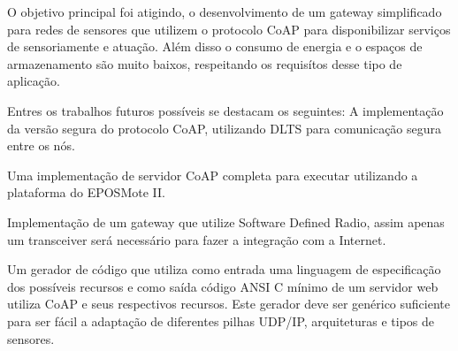 O objetivo principal foi atigindo, o desenvolvimento de um gateway simplificado para redes de sensores que utilizem o protocolo CoAP para disponibilizar servi\c{c}os de sensoriamente e atua\c{c}\~ao. Al\'em disso o consumo de energia e o espa\c{c}os de armazenamento s\~ao muito baixos, respeitando os requis\'itos desse tipo de aplica\c{c}\~ao.

Entres os trabalhos futuros poss\'iveis se destacam os seguintes:
A implementa\c{c}\~ao da vers\~ao segura do protocolo CoAP, utilizando DLTS para comunica\c{c}\~ao segura entre os n\'os.

Uma implementa\c{c}\~ao de servidor CoAP completa para executar utilizando a plataforma do EPOSMote II.

Implementa\c{c}\~ao de um gateway que utilize Software Defined Radio, assim apenas um transceiver ser\'a necess\'ario para
fazer a integra\c{c}\~ao com a Internet.

Um gerador de c\'odigo que utiliza como entrada uma linguagem de especifica\c{c}\~ao dos poss\'iveis recursos e como sa\'ida c\'odigo ANSI C m\'inimo de um servidor web utiliza CoAP e seus respectivos recursos. Este gerador deve ser gen\'erico suficiente para ser f\'acil a adapta\c{c}\~ao de diferentes pilhas UDP/IP, arquiteturas e tipos de sensores.
